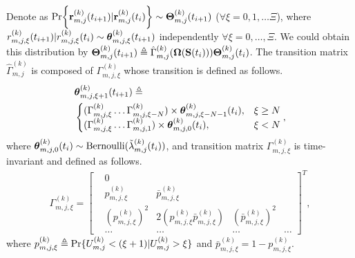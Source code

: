 Denote as $\Pr\Brace{\vec{r}^{(k)}_{m,j}(t_{i+1})|\vec{r}^{(k)}_{m,j}(t_{i})} \sim \vecG{\Theta}^{(k)}_{m,j}(t_{i+1})$ ($\forall \xi=0,1,\dots\Xi$), where $r^{(k)}_{m,j,\xi}(t_{i+1})|r^{(k)}_{m,j,\xi}(t_{i}) \sim \boldsymbol{\theta}^{(k)}_{m,j,\xi}(t_{i+1})$ independently $\forall \xi=0,\dots,\Xi$.
We could obtain this distribution by $\boldsymbol{\Theta}^{(k)}_{m,j}(t_{i+1}) \triangleq \hat{\Gamma}^{(k)}_{m,j}(\boldsymbol{\Omega}(\mathbf{S}(t_i))) \boldsymbol{\Theta}^{(k)}_{m,j}(t_{i})$. The transition matrix $\hat{\Gamma}^{(k)}_{m,j}$ is composed of $\Gamma^{(k)}_{m,j,\xi}$ whose transition is defined as follows.
\begin{align}
    &\boldsymbol{\theta}^{(k)}_{m,j,\xi+1}(t_{i+1}) \triangleq
    \nonumber\\
    &\begin{cases}
        ( \Gamma^{(k)}_{m,j,\xi} \dots \Gamma^{(k)}_{m,j,\xi-N} ) \times \boldsymbol{\theta}^{(k)}_{m,j,\xi-N-1}(t_i), &{\xi \geq N}
        \\
        ( \Gamma^{(k)}_{m,j,\xi} \dots \Gamma^{(k)}_{m,j,1} ) \times \boldsymbol{\theta}^{(k)}_{m,j,0}(t_i), &{\xi < N}
    \end{cases},
\end{align}
where $\boldsymbol{\theta}^{(k)}_{m,j,0}(t_{i}) \sim \text{Bernoulli}(\tilde{\lambda}^{(k)}_{m,j}(t_i))$, and transition matrix $\Gamma^{(k)}_{m,j,\xi}$ is time-invariant and defined as follows.
\begin{align}
    \Gamma^{(k)}_{m,j,\xi} = 
    \begin{bmatrix}
        &0 \\
        &p^{(k)}_{m,j,\xi} &\bar{p}^{(k)}_{m,j,\xi} \\
        &(p^{(k)}_{m,j,\xi})^2 &2(p^{(k)}_{m,j,\xi}\bar{p}^{(k)}_{m,j,\xi}) &(\bar{p}^{(k)}_{m,j,\xi})^2 \\
        &\dots &\dots &\dots &\dots
    \end{bmatrix}^T,
\end{align}
where $p^{(k)}_{m,j,\xi} \triangleq \Pr\{U^{(k)}_{m,j} < (\xi+1) | U^{(k)}_{m,j}>\xi\}$ and $\bar{p}^{(k)}_{m,j,\xi} = 1 - p^{(k)}_{m,j,\xi}$.

